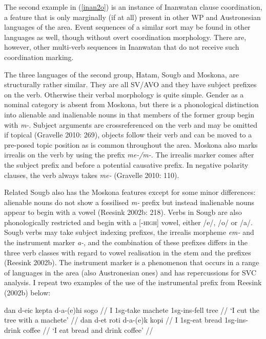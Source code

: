 The second example in (\ref{inan2o}) is an instance of Inanwatan clause coordination, a feature that is only marginally (if at all) present in other WP and Austronesian languages of the area. Event sequences of a similar sort may be found in other languages as well, though without overt coordination morphology. There are, however, other multi-verb sequences in Inanwatan that do not receive such coordination marking.

The three languages of the second group, Hatam, Sougb and Moskona, are structurally rather similar. They are all SV/AVO and they have subject prefixes on the verb. Otherwise their verbal morphology is quite simple. Gender as a nominal category is absent from Moskona, but there is a phonological distinction into alienable and inalienable nouns in that members of the former group begin with \textit{m-}. Subject arguments are crossreferenced on the verb and may be omitted if topical (Gravelle 2010: 269), objects follow their verb and can be moved to a pre-posed topic position as is common throughout the area. Moskona also marks irrealis on the verb by using the prefix \textit{me-/m-}. The irrealis marker comes after the subject prefix and before a potential causative prefix. In negative polarity clauses, the verb always takes \textit{me-} (Gravelle 2010: 110). 

Related Sougb also has the Moskona features except for some minor differences: alienable nouns do not show a fossilised \textit{m-} prefix but instead inalienable nouns appear to begin with a vowel (Reesink 2002b: 218). Verbs in Sougb are also phonologically restricted and begin with a [-\textsc{high}] vowel, either /e/, /o/ or /a/. Sougb verbs may take subject indexing prefixes, the irrealis morpheme \textit{em-} and the instrument marker \textit{a-}, and the combination of these prefixes differs in the three verb classes with regard to vowel realisation in the stem and the prefixes (Reesink 2002b). The instrument marker is a phenomenon that occurs in a range of languages in the area (also Austronesian ones) and has repercussions for SVC analysis. I repeat two examples of the use of the instrumental prefix from Reesink (2002b) below:

\pex 
\a
\begingl
\gla dan d-eic kepta d-a-(e)hi sogo // 
\glb I \acs{1}\acs{sg}-take machete \acs{1}\acs{sg}-\acs{ins}-fell tree //
\glft `I cut the tree with a machete' // 
\endgl
\a \label{sougb1}
\begingl
\gla dan d-et roti d-a-(e)k kopi // 
\glb I \acs{1}\acs{sg}-eat bread \acs{1}\acs{sg}-\acs{ins}-drink coffee //
\glft `I eat bread and drink coffee' // 
\endgl
\xe

